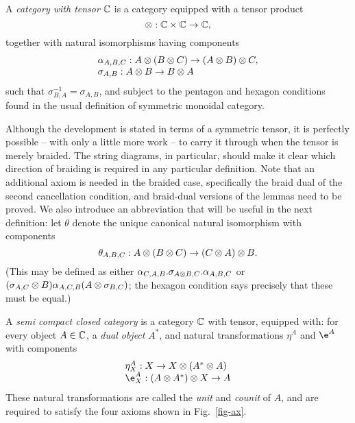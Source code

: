 \documentclass{robinthesisdraft}
\begin{document}
\begin{definition}
A \emph{category with tensor} $\mathbb{C}$ is a category equipped with a tensor product
\[
	\tn: \C\times\C\to\C,
\]
together with natural isomorphisms having components
\[\begin{array}{l}
	\alpha_{A,B,C}: A\tn(B\tn C) \to (A\tn B)\tn C,\\
	\sigma_{A,B}: A\tn B \to B\tn A
\end{array}\]
such that $\sigma_{B,A}^{-1} = \sigma_{A,B}$, and subject to the pentagon and hexagon conditions
found in the usual definition of symmetric monoidal category.
\end{definition}
%
Although the development is stated in terms of a symmetric tensor, it is perfectly
possible -- with only a little more work -- to carry it through when the tensor is
merely braided. The string diagrams, in particular, should make it clear which
direction of braiding is required in any particular definition. Note that an additional
axiom is needed in the braided case, specifically the braid dual of the second
cancellation condition, and braid-dual versions of the lemmas need to be proved.
We also introduce an abbreviation that will be useful in the next definition:
let $\theta$ denote the unique canonical natural isomorphism with components
\[
	\theta_{A,B,C}: A\tn(B\tn C) \to (C\tn A)\tn B.
\]
(This may be defined as either
$\alpha_{C,A,B}.\sigma_{A\tn B,C}.\alpha_{A,B,C}$
or
$(\sigma_{A,C}\tn B)\alpha_{A,C,B}(A\tn\sigma_{B,C})$;
the hexagon condition says precisely that these must be equal.)
\begin{definition}
A \emph{semi compact closed category} is a category $\mathbb{C}$ with tensor, equipped
with:
for every object $A\in\mathbb{C}$, a \emph{dual object} $A^*$, and
natural transformations $\eta^A$ and $\e^A$ with components
\[\begin{array}l
	\eta^A_X: X \to X\tn(A^*\tn A)\\
	\e^A_X: (A\tn A^*)\tn X \to A
\end{array}\]
These natural transformations are called the \emph{unit} and \emph{counit}
of $A$, and are required to satisfy the four axioms shown in Fig.~\ref{fig-ax}.
\end{definition}
\end{document}
